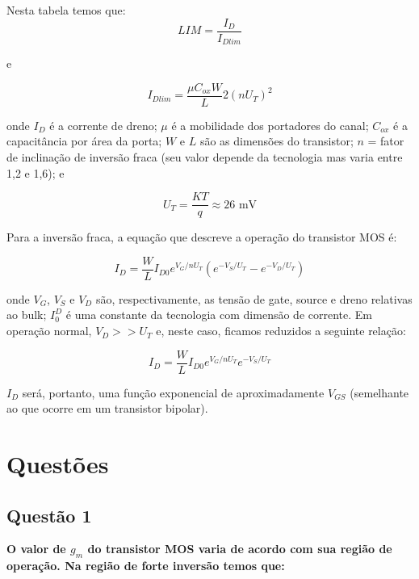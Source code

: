 ﻿\documentclass[12pt,a4paper]{article}
\begin{document}
Nesta tabela temos que:
\begin{equation}
LIM = \frac{I_D}{I_{Dlim}}
\end{equation}

e

\begin{equation}
I_{Dlim} = \frac{\mu C_{ox} W}{L} 2 \left(nU_T\right)^2
\end{equation}

onde $I_D$ é a corrente de dreno; $\mu$ é a mobilidade dos portadores do canal; $C_{ox}$ é a capacitância por área da porta; $W$ e $L$ são as dimensões do transistor; $n$ = fator de inclinação de inversão fraca (seu valor depende da tecnologia mas varia entre 1,2 e 1,6); e

\begin{equation}
U_T = \frac{KT}{q} \approx 26 \text{ mV}
\end{equation}

Para a inversão fraca, a equação que descreve a operação do transistor MOS é:

\begin{equation}
I_D = \frac{W}{L} I_{D0} e^{V_G/nU_T} \left( e^{-V_S/U_T} - e^{-V_D/U_T} \right)
\end{equation}

onde $V_G$, $V_S$ e $V_D$ são, respectivamente, as tensão de gate, source e dreno relativas ao bulk; $I_0^D$ é uma constante da tecnologia com dimensão de corrente. Em operação normal, $V_D >> U_T$ e, neste caso, ficamos reduzidos a seguinte relação:

\begin{equation}
I_D = \frac{W}{L} I_{D0} e^{V_G/nU_T} e^{-V_S/U_T}
\end{equation}

$I_D$ será, portanto, uma função exponencial de aproximadamente $V_{GS}$ (semelhante ao que ocorre em um transistor bipolar).

\newpage

\section*{Questões}

\subsection*{Questão 1}
\textbf{O valor de $g_m$ do transistor MOS varia de acordo com sua região de operação. Na região de forte inversão temos que:}
\end{document}
